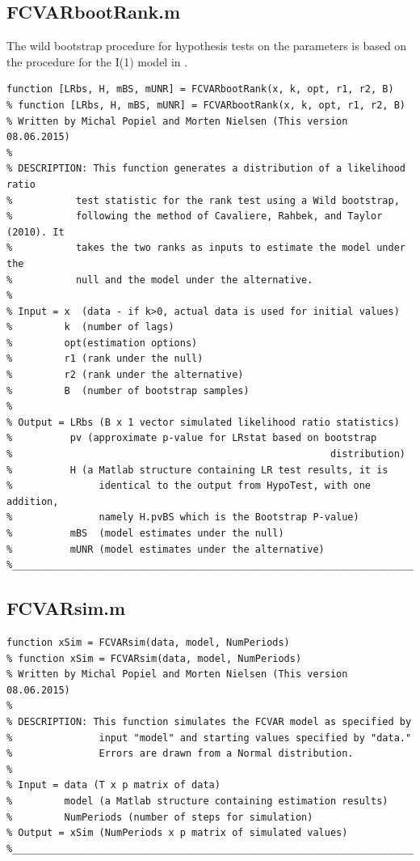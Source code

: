 \documentclass[10pt]{article}
\begin{document}
\subsection{FCVARbootRank.m}
The wild bootstrap procedure for hypothesis tests on the parameters is based on the procedure for the I(1) model in \cite{Cavaliere2010}.
\begin{lstlisting}[frame=single,caption={FCVARbootRank.m}]
function [LRbs, H, mBS, mUNR] = FCVARbootRank(x, k, opt, r1, r2, B)
% function [LRbs, H, mBS, mUNR] = FCVARbootRank(x, k, opt, r1, r2, B)
% Written by Michal Popiel and Morten Nielsen (This version 08.06.2015)
% 
% DESCRIPTION: This function generates a distribution of a likelihood ratio
%           test statistic for the rank test using a Wild bootstrap, 
%			following the method of Cavaliere, Rahbek, and Taylor (2010). It 
%           takes the two ranks as inputs to estimate the model under the 
%           null and the model under the alternative.
%
% Input = x  (data - if k>0, actual data is used for initial values)
%         k  (number of lags)
%		  opt(estimation options)
%         r1 (rank under the null)
%         r2 (rank under the alternative)
%         B  (number of bootstrap samples)
% 
% Output = LRbs (B x 1 vector simulated likelihood ratio statistics)
%          pv (approximate p-value for LRstat based on bootstrap 
%                                                       distribution)
%          H (a Matlab structure containing LR test results, it is
%               identical to the output from HypoTest, with one addition,
%               namely H.pvBS which is the Bootstrap P-value)
%          mBS  (model estimates under the null)
%          mUNR (model estimates under the alternative)
%_________________________________________________________________________
\end{lstlisting}

\subsection{FCVARsim.m}
\begin{lstlisting}[frame=single,caption={FCVARsim.m}]
function xSim = FCVARsim(data, model, NumPeriods)
% function xSim = FCVARsim(data, model, NumPeriods)
% Written by Michal Popiel and Morten Nielsen (This version 08.06.2015)
% 
% DESCRIPTION: This function simulates the FCVAR model as specified by
%               input "model" and starting values specified by "data."
%               Errors are drawn from a Normal distribution. 
%
% Input = data (T x p matrix of data)
%         model (a Matlab structure containing estimation results)
%         NumPeriods (number of steps for simulation)
% Output = xSim (NumPeriods x p matrix of simulated values)
%_________________________________________________________________________
\end{lstlisting}
\end{document}
